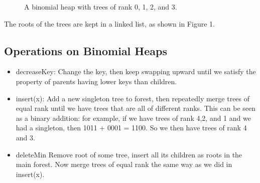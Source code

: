 \documentclass[11pt]{article}
\begin{document}
\begin{figure}
\centering
{}
\caption{A binomial heap with trees of rank 0, 1, 2, and 3.}
\end{figure}

The roots of the trees are kept in a linked list, as shown in Figure 1.

\subsection{Operations on Binomial Heaps}

\begin{itemize}
\item decreaseKey: Change the key, then keep swapping upward until we satisfy the property of parents having lower keys than children.

\item insert(x): Add a new singleton tree to forest, then repeatedly merge trees of equal rank until we have trees that are all of different ranks. This can be seen as a binary addition: for example, if we have trees of rank 4,2, and 1 and we had a singleton, then 1011 + 0001 = 1100. So we then have trees of rank 4 and 3.

\item deleteMin Remove root of some tree, insert all its children as roots in the main forest. Now merge trees of equal rank the same way as we did in insert(x).
\end{itemize}
\end{document}
